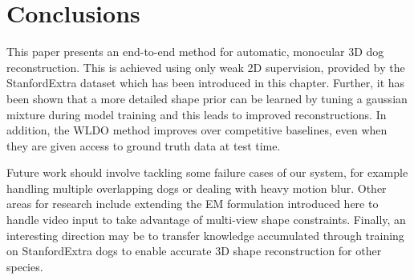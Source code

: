 
\section{Conclusions}
This paper presents an end-to-end method for automatic, monocular 3D dog reconstruction. This is achieved using only weak 2D supervision, provided by the StanfordExtra dataset which has been introduced in this chapter. Further, it has been shown that a more detailed shape prior can be learned by tuning a gaussian mixture during model training and this leads to improved reconstructions. In addition, the WLDO method improves over competitive baselines, even when they are given access to ground truth data at test time.

Future work should involve tackling some failure cases of our system, for example handling multiple overlapping dogs or dealing with heavy motion blur. Other areas for research include extending the EM formulation introduced here to handle video input to take advantage of multi-view shape constraints. Finally, an interesting direction may be to transfer knowledge accumulated through training on StanfordExtra dogs to enable accurate 3D shape reconstruction for other species.

% 




